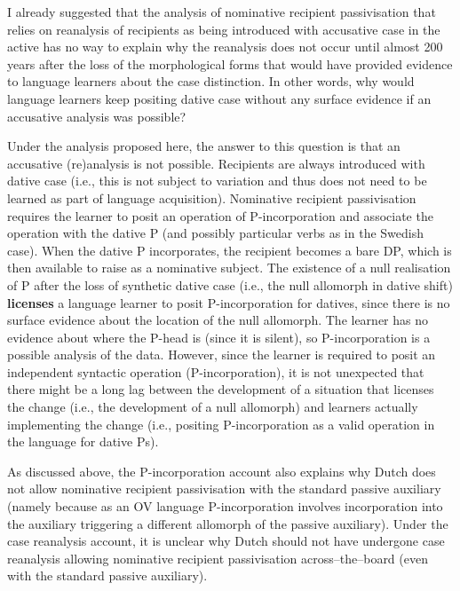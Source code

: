 I already suggested that the analysis of nominative recipient passivisation that relies on reanalysis of recipients as being introduced with accusative case in the active has no way to explain why the reanalysis does not occur until almost 200 years after the loss of the morphological forms that would have provided evidence to language learners about the case distinction. In other words, why would language learners keep positing dative case without any surface evidence if an accusative analysis was possible? 

Under the analysis proposed here, the answer to this question is that an accusative (re)analysis is not possible. Recipients are always introduced with dative case (i.e., this is not subject to variation and thus does not need to be learned as part of language acquisition). Nominative recipient passivisation requires the learner to posit an operation of P-incorporation and associate the operation with the dative P (and possibly particular verbs as in the Swedish case). When the dative P incorporates, the recipient becomes a bare DP, which is then available to raise as a nominative subject. The existence of a null realisation of P after the loss of synthetic dative case (i.e., the null allomorph in dative shift) \textbf{licenses} a language learner to posit P-incorporation for datives, since there is no surface evidence about the location of the null allomorph. The learner has no evidence about where the P-head is (since it is silent), so P-incorporation is a possible analysis of the data. However, since the learner is required to posit an independent syntactic operation (P-incorporation), it is not unexpected that there might be a long lag between the development of a situation that licenses the change (i.e., the development of a null allomorph) and learners actually implementing the change (i.e., positing P-incorporation as a valid operation in the language for dative Ps).

As discussed above, the P-incorporation account also explains why Dutch does not allow nominative recipient passivisation with the standard passive auxiliary (namely because as an OV language P-incorporation involves incorporation into the auxiliary triggering a different allomorph of the passive auxiliary). Under the case reanalysis account, it is unclear why Dutch should not have undergone case reanalysis allowing nominative recipient passivisation across--the--board (even with the standard passive auxiliary).

